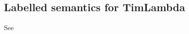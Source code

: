 \documentclass[acmsmall,review,dvipsnames]{acmart}
\newcommand{\Value}{W}
\newcommand{\semfun}[1]{\mathcal{#1}}
\newcommand{\semapp}[3]{\semfun{#1}\llbracket #2 \rrbracket\, #3}
\newcommand{\extendrho}[2]{#1[#2]}
\newcommand{\mtyped}{\Value^{?}}
\begin{document}
% 
% 

\subsection{Labelled semantics for TimLambda}
See 
\end{document}
